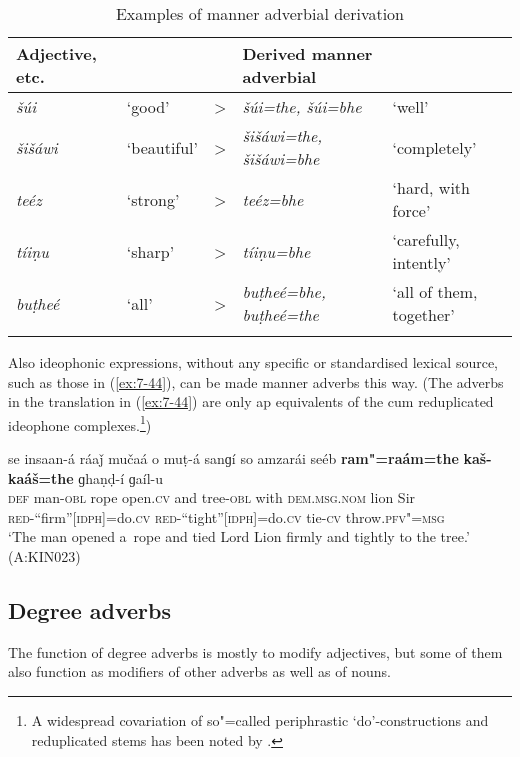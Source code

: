 \begin{table}[ht]
\caption{Examples of manner adverbial derivation}

\begin{tabularx}{\textwidth}{ P{17mm} l l Q Q }
\lsptoprule
Adjective, etc. &
&
&
Derived manner adverbial &
\\\midrule
\textit{šúi} &
`good' &
{\textgreater} &
\textit{šúi=the, šúi=bhe} &
`well'\\
\textit{šišáwi} &
`beautiful' &
{\textgreater} &
\textit{šišáwi=the, šišáwi=bhe} &
`completely'\\
\textit{teéz} &
`strong' &
{\textgreater} &
\textit{teéz=bhe} &
`hard, with force'\\
\textit{tíiṇu} &
`sharp' &
{\textgreater} &
\textit{tíiṇu=bhe} &
`carefully, intently'\\
\textit{buṭheé} &
`all' &
{\textgreater} &
\textit{buṭheé=bhe, buṭheé=the} &
`all of them, together'\\\lspbottomrule
\end{tabularx}
\label{tab:7-3}
\end{table}


Also ideophonic expressions, without any specific or standardised lexical source, such as those in (\ref{ex:7-44}), can be made manner adverbs this way. (The adverbs in the \iliEnglish translation in (\ref{ex:7-44}) are only ap equivalents of the  cum reduplicated ideophone complexes.\footnote{A widespread covariation of so"=called periphrastic `do'-constructions and reduplicated stems has been noted by \citet{jaeger2006}.})

\begin{exe}
\ex
\label{ex:7-44}
\gll se insaan-á ráaǰ mučaá o muṭ-á sanɡí  so amzarái seéb
     \textbf{ram"=raám=the} \textbf{kaš-kaáš=the} ɡhaṇḍ-í ɡaíl-u\\
\textsc{def} man-\textsc{obl} rope open.\textsc{cv} and tree-\textsc{obl} with \textsc{dem.msg.nom} lion Sir \textsc{red}-``firm''[\textsc{idph}]=do.\textsc{cv} \textsc{red}-``tight''[\textsc{idph}]=do.\textsc{cv} tie-\textsc{cv} throw.\textsc{pfv"=msg}\\
\glt `The man opened a~rope and tied Lord Lion firmly and tightly to the tree.' (A:KIN023)
\end{exe}

\subsection{Degree adverbs}
\label{subsec:7-1-5}
The function of degree adverbs is mostly to modify adjectives, but some of them also function as modifiers of other adverbs as well as of nouns. 

